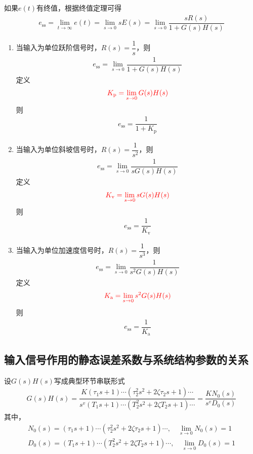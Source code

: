 如果$e(t)$有终值，根据终值定理可得
\begin{align}
	e_{\text{ss}} = \lim\limits_{t \to \infty}e(t) = \lim\limits_{s \to 0}sE(s) = \lim\limits_{s \to 0}\dfrac{sR(s)}{1+G(s)H(s)}
\end{align}
\begin{enumerate}
	\item 当输入为单位跃阶信号时，$R(s) = \dfrac{1}{s}$，则
		\begin{align}
			e_{\text{ss}} = \lim\limits_{s \to 0} \dfrac{1}{1 + G(s) H(s)}
		\end{align}
		定义
		\begin{align}
			\textcolor{red}{ K_{\text{p}} = \lim\limits_{s \to 0}G(s)H(s)}
		\end{align}
		则
		\begin{align*}
			e_{\text{ss}} = \dfrac{1}{1 + K_{\text{p}}}
		\end{align*}
	
	\item 当输入为单位斜坡信号时，$R(s) = \dfrac{1}{s^2}$，则
	\begin{align}
		e_{\text{ss}} = \lim\limits_{s \to 0}\dfrac{1}{s G(s)H(s)}
	\end{align}
	定义
	\begin{align}
		\textcolor{red}{K_{\text{v}} = \lim\limits_{s \to 0}sG(s)H(s)}
	\end{align}
	则
	\begin{align*}
		e_{\text{ss}} = \dfrac{1}{K_{\text{v}}}
	\end{align*}

	\item 当输入为单位加速度信号时，$R(s) = \dfrac{1}{s^3}$，则
	\begin{align}
		e_{\text{ss}} = \lim\limits_{s \to 0}\dfrac{1}{s^2 G(s)H(s)}
	\end{align}
	定义
	\begin{align}
		\textcolor{red}{K_{\text{a}} = \lim\limits_{s \to 0}s^2 G(s)H(s)}
	\end{align}
	则
	\begin{align*}
		e_{\text{ss}} = \dfrac{1}{K_{\text{a}}}
	\end{align*}
\end{enumerate}

\subsection{输入信号作用的静态误差系数与系统结构参数的关系}
设$G(s)H(s)$写成典型环节串联形式
\begin{align}
	G(s)H(s) = \dfrac{K(\tau_1s + 1)\cdots (\tau_2^2s^2 +2\zeta\tau_2 s+ 1)\cdots}{s^v(T_1s + 1)\cdots(T_2^2 s^2+ 2\zeta T_2 s +1)\cdots} = \dfrac{KN_0(s)}{s^vD_0(s)}
\end{align}
其中，
\begin{align*}
	N_0(s) = (\tau_1s + 1)\cdots (\tau_2^2s^2 +2\zeta\tau_2 s + 1)\cdots, \quad \lim\limits_{s \to 0} N_0(s) = 1\\
	D_0(s) = (T_1s + 1)\cdots(T_2^2s^2 + 2\zeta T_2 s +1)\cdots, \quad \lim\limits_{s \to 0}D_0(s) =1
\end{align*}

